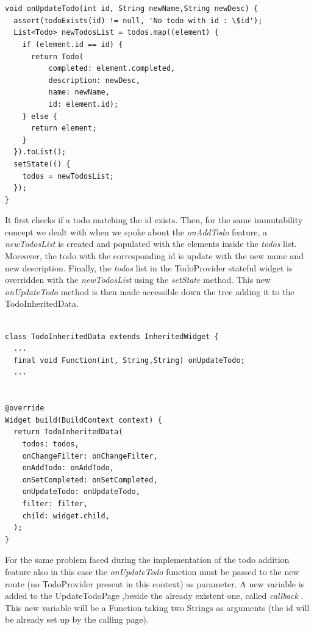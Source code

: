 \mbox{}\\


\begin{verbatim}

void onUpdateTodo(int id, String newName,String newDesc) {
  assert(todoExists(id) != null, 'No todo with id : \$id');
  List<Todo> newTodosList = todos.map((element) {
    if (element.id == id) {
      return Todo(
          completed: element.completed,
          description: newDesc,
          name: newName,
          id: element.id);
    } else {
      return element;
    }
  }).toList();
  setState(() {
    todos = newTodosList;
  });
}

\end{verbatim}


It first checks if a todo matching the id exists. Then, for the same immutability concept we dealt with when we spoke about the \textit{onAddTodo} feature, a \textit{newTodosList }is created and populated with the elements inside the \textit{todos }list. Moreover, the todo with the corresponding id is update with the new name and new description. Finally, the \textit{todos }list in the TodoProvider stateful widget is overridden with the \textit{newTodosList }using the \textit{setState} method.
This new \textit{onUpdateTodo} method is then made accessible down the tree adding it to the TodoInheritedData.
\mbox{}\\


\begin{verbatim}

class TodoInheritedData extends InheritedWidget {
  ...
  final void Function(int, String,String) onUpdateTodo;
  ...


@override
Widget build(BuildContext context) {
  return TodoInheritedData(
    todos: todos,
    onChangeFilter: onChangeFilter,
    onAddTodo: onAddTodo,
    onSetCompleted: onSetCompleted,
    onUpdateTodo: onUpdateTodo,
    filter: filter,
    child: widget.child,
  );
}
\end{verbatim}

For the same problem faced during the implementation of the todo addition feature also in this case the \textit{onUpdateTodo } function must be passed to the new route (no TodoProvider present in this context) as parameter. A new variable is added to the UpdateTodoPage ,beside the already existent one, called \textit{callback }. This new variable will be a Function taking two Strings as arguments (the id will be already set up by the calling page).

